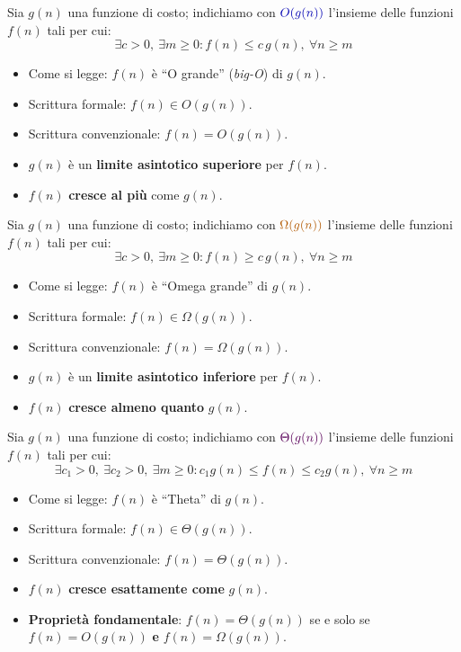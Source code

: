 \documentclass[12pt, a4paper]{article}
\begin{document}
\begin{tcolorbox}[colback=lightergray!10, colframe=tocsec, title=\textbf{Definizione: Notazione $O$ (O-grande)}]
\label{def:notazione-o}
Sia $g(n)$ una funzione di costo; indichiamo con $\textcolor{blue!70!black}{O(g(n))}$ l'insieme delle funzioni $f(n)$ tali per cui:
$$\exists c > 0,\ \exists m \ge 0 : f(n) \le c\,g(n),\ \forall n \ge m$$
\begin{itemize}
    \item Come si legge: $f(n)$ è ``O grande'' (\textit{big-O}) di $g(n)$.
    \item Scrittura formale: $f(n) \in O(g(n))$.
    \item Scrittura convenzionale: $f(n) = O(g(n))$.
    \item $g(n)$ è un \textbf{limite asintotico superiore} per $f(n)$.
    \item $f(n)$ \textbf{cresce al più} come $g(n)$.
\end{itemize}
\end{tcolorbox}

\begin{tcolorbox}[colback=lightergray!10, colframe=tocsec, title=\textbf{Definizione: Notazione $\Omega$ (Omega-grande)}]
\label{def:notazione-omega}
Sia $g(n)$ una funzione di costo; indichiamo con $\textcolor{orange!70!black}{\Omega(g(n))}$ l'insieme delle funzioni $f(n)$ tali per cui:
$$\exists c > 0,\ \exists m \ge 0 : f(n) \ge c\,g(n),\ \forall n \ge m$$
\begin{itemize}
    \item Come si legge: $f(n)$ è ``Omega grande'' di $g(n)$.
    \item Scrittura formale: $f(n) \in \Omega(g(n))$.
    \item Scrittura convenzionale: $f(n) = \Omega(g(n))$.
    \item $g(n)$ è un \textbf{limite asintotico inferiore} per $f(n)$.
    \item $f(n)$ \textbf{cresce almeno quanto} $g(n)$.
\end{itemize}
\end{tcolorbox}

\begin{tcolorbox}[colback=lightergray!10, colframe=tocsec, title=\textbf{Definizione: Notazione $\Theta$ (Theta)}]
\label{def:notazione-theta}
Sia $g(n)$ una funzione di costo; indichiamo con $\textcolor{violet!70!black}{\Theta(g(n))}$ l'insieme delle funzioni $f(n)$ tali per cui:
$$\exists c_1 > 0,\ \exists c_2 > 0,\ \exists m \ge 0 : c_1 g(n) \le f(n) \le c_2 g(n),\ \forall n \ge m$$
\begin{itemize}
    \item Come si legge: $f(n)$ è ``Theta'' di $g(n)$.
    \item Scrittura formale: $f(n) \in \Theta(g(n))$.
    \item Scrittura convenzionale: $f(n) = \Theta(g(n))$.
    \item $f(n)$ \textbf{cresce esattamente come} $g(n)$.
    \item \textbf{Proprietà fondamentale}: $f(n) = \Theta(g(n))$ se e solo se $f(n) = O(g(n))$ \textbf{e} $f(n) = \Omega(g(n))$.
\end{itemize}
\end{tcolorbox}
\end{document}
